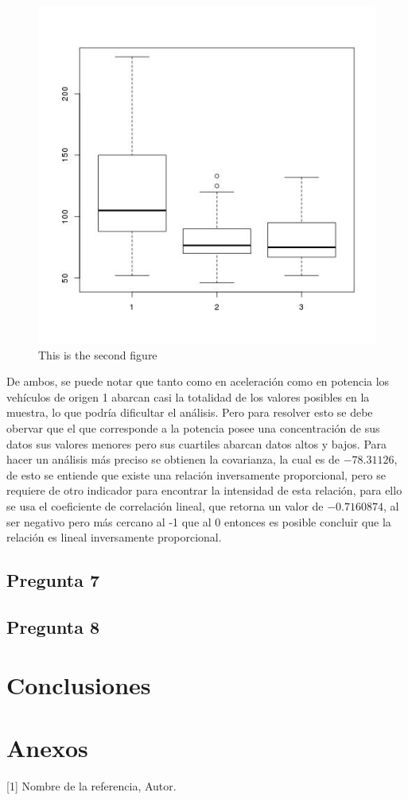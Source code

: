 \documentclass[letter,10pt]{article}
\begin{document}
\begin{minipage}{\linewidth}
\begin{minipage}{0.45\linewidth}
\begin{figure}[H]
              \includegraphics[width=\linewidth]{boxplot_horsepower_origin.jpg}
              \caption{This is the second figure}
          \end{figure}
      \end{minipage}
  \end{minipage}
De ambos, se puede notar que  tanto como en aceleración como en potencia los vehículos de origen 1 abarcan casi la totalidad de los
valores posibles en la muestra, lo que podría dificultar el análisis. Pero para resolver esto se debe obervar que el que corresponde a la potencia
posee una concentración de sus datos sus valores menores pero sus cuartiles abarcan datos altos y bajos.
Para hacer un análisis más preciso se obtienen la covarianza, la cual es de $-78.31126$, de esto se entiende que existe una relación inversamente proporcional,
pero se requiere de otro indicador para encontrar la intensidad de esta relación, para ello se usa el coeficiente de correlación lineal, que retorna un valor de 
$-0.7160874$, al ser negativo pero más cercano al -1 que al 0 entonces es posible concluir que la relación es lineal inversamente proporcional.


\subsection{Pregunta 7}



\subsection{Pregunta 8}


\section{Conclusiones}

\section{Anexos}





[1] Nombre de la referencia, Autor.
\end{document}
